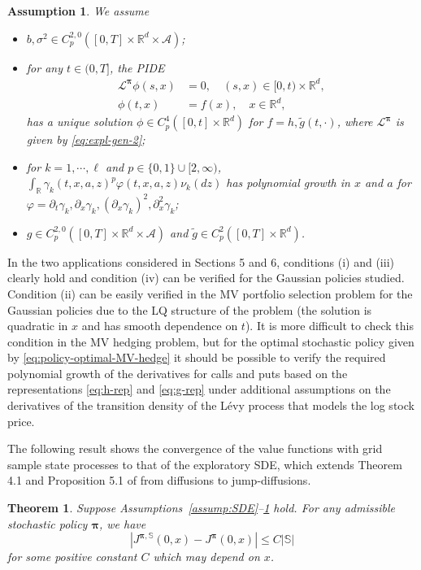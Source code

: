 \documentclass[11pt]{article}
\newtheorem{theorem}{Theorem}
\newtheorem{assumption}{Assumption}
\newcommand{\1}{\mathbbm{1}}
\newcommand{\bpi}{\boldsymbol{\pi}}
\begin{document}
\begin{assumption}\label{assumption-converg}
We assume
\begin{itemize}
\item [(i)] $b, \sigma^2\in C^{2,0}_p([0,T]\times\mathbb{R}^d\times\mathcal{A})$;
\item [(ii)] for any $t\in(0,T]$, the PIDE
\begin{align}\label{eq:PIDE}
 \mathcal{L}^{\bpi} \phi(s,x) &= 0, \quad (s,x) \in [0,t) \times \mathbb{R}^d,  \\
\phi(t,x) &= f(x), \quad x \in \mathbb{R}^d,
\end{align}
has a unique solution $\phi \in C^{4}_p([0,t]\times\mathbb{R}^d)$ for $f=h, \tilde{g}(t,\cdot)$, where $\mathcal{L}^{\bpi}$ is given by \eqref{eq:expl-gen-2};
\item[(iii)] for $k=1,\cdots,\ell$ and $p\in \{0,1\}\cup[2,\infty)$, $\int_{\mathbb{R}}\gamma_k(t,x,a,z)^p\varphi(t,x,a,z)\nu_k(dz)$ has polynomial growth in $x$ and $a$ for $\varphi=\partial_t\gamma_k, \partial_x\gamma_k, (\partial_x\gamma_k)^2, \partial_{x}^2\gamma_k$;
\item[(iv)] $g\in C^{2,0}_p([0,T]\times\mathbb{R}^d\times\mathcal{A})$ and $\tilde{g}\in C^{2}_p([0,T]\times\mathbb{R}^d)$.
\end{itemize}
\end{assumption}

In the two applications considered in Sections 5 and 6, conditions (i) and (iii) clearly hold and condition (iv) can be verified for the Gaussian policies studied. Condition (ii) can be easily verified in the MV portfolio selection problem for the Gaussian policies due to the LQ structure of the problem (the solution is quadratic in $x$ and has smooth dependence on $t$). It is more difficult to check this condition in the MV hedging problem, but for the optimal stochastic policy given by \eqref{eq:policy-optimal-MV-hedge} it should be possible to verify the required polynomial growth of the derivatives for calls and puts based on the representations \eqref{eq:h-rep} and \eqref{eq:g-rep} under  additional assumptions on the derivatives of the transition density of the L\'evy process that models the log stock price.


The following result shows the convergence of the value functions with grid sample state processes to that of the exploratory SDE, which extends Theorem 4.1 and Proposition 5.1 of \cite{jia2025accuracy} from diffusions to jump-diffusions.

\begin{theorem}\label{thm:value-converge}
Suppose Assumptions~\ref{assump:SDE}--\ref{assumption-converg} hold. For any admissible stochastic policy $\bpi$, we have
\begin{equation}
	|J^{\bpi,\mathbb{S}}(0,x) - J^{\bpi}(0,x)|\leq C|\mathbb{S}|
\end{equation}
for some positive constant $C$ which may depend on $x$.
\end{theorem}
\end{document}
